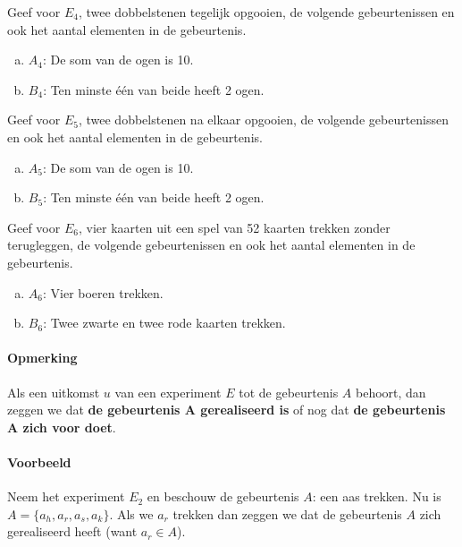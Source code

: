 \documentclass[12pt,twoside]{article}
\begin{document}
\begin{oefening}
Geef voor $E_4$, twee dobbelstenen tegelijk opgooien, de volgende gebeurtenissen en ook het aantal elementen in de gebeurtenis.
\begin{enumerate}[(a)]
  \item $A_4$: De som van de ogen is 10.
  \item $B_4$: Ten minste één van beide heeft 2 ogen.
\end{enumerate}
\end{oefening}

\begin{oefening}
Geef voor $E_5$, twee dobbelstenen na elkaar opgooien, de volgende gebeurtenissen en ook het aantal elementen in de gebeurtenis.
\begin{enumerate}[(a)]
  \item $A_5$: De som van de ogen is 10.
  \item $B_5$: Ten minste één van beide heeft 2 ogen.
\end{enumerate}
\end{oefening}

\begin{oefening}
Geef voor $E_6$, vier kaarten uit een spel van 52 kaarten trekken zonder terugleggen, de volgende gebeurtenissen en ook het aantal elementen in de gebeurtenis.
\begin{enumerate}[(a)]
  \item $A_6$: Vier boeren trekken.
  \item $B_6$: Twee zwarte en twee rode kaarten trekken.
\end{enumerate}
\end{oefening}

\paragraph*{Opmerking}
Als een uitkomst $u$ van een experiment $E$ tot de gebeurtenis $A$ behoort, dan zeggen we dat {\bf de gebeurtenis A gerealiseerd is} of nog dat {\bf de gebeurtenis A zich voor doet}.

\paragraph*{Voorbeeld}
Neem het experiment $E_2$ en beschouw de gebeurtenis $A$: een aas trekken. Nu is $A = \{a_h , a_r , a_s , a_k \}$.
Als we $a_r$ trekken dan zeggen we dat de gebeurtenis $A$ zich gerealiseerd heeft (want $a_r \in A$).
\end{document}
